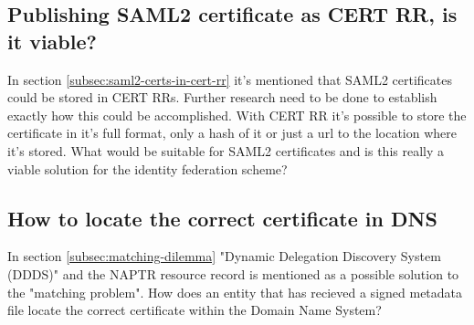 \subsection{Publishing SAML2 certificate as CERT RR, is it viable?}
In section \ref{subsec:saml2-certs-in-cert-rr} it's mentioned that SAML2 certificates could be stored in CERT RRs.
Further research need to be done to establish exactly how this could be accomplished.
With CERT RR it's possible to store the certificate in it's full format, only a hash of it or just a url to the location where it's stored\cite[ch. 2.1]{rfc:4398}.
What would be suitable for SAML2 certificates and is this really a viable solution for the identity federation scheme?

\subsection{How to locate the correct certificate in DNS}
In section \ref{subsec:matching-dilemma} "Dynamic Delegation Discovery System (DDDS)"\cite{rfc:3401,rfc:3402,rfc:3403,rfc:3404} and the NAPTR resource record\cite{rfc:3403} is mentioned as a possible solution to the "matching problem".
How does an entity that has recieved a signed metadata file locate the correct certificate within the Domain Name System?



